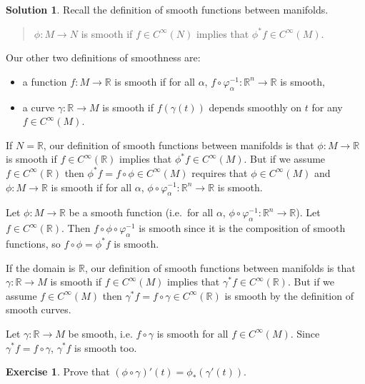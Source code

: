 \documentclass[11pt, a4paper]{article}
\theoremstyle{definition}
\newtheorem{ex}{Exercise}[part]
\newtheorem{sol}{Solution}[part]
\begin{document}
\begin{sol}

Recall the definition of smooth functions between manifolds.

\begin{quote}
    $\phi: M \to N$ is smooth if $f \in C^\infty(N)$ implies that $\phi^* f \in C^\infty(M)$.
\end{quote}

Our other two definitions of smoothness are:
\begin{itemize}
    \item a function $f: M \to \mathbb{R}$ is smooth if for all $\alpha$, $f \circ \varphi_\alpha^{-1}: \mathbb{R}^n \to \mathbb{R}$ is smooth,
    \item a curve $\gamma: \mathbb{R} \to M$ is smooth if $f(\gamma(t))$ depends smoothly on $t$ for any $f \in C^\infty(M)$.
\end{itemize}

If $N = \mathbb{R}$, our definition of smooth functions between manifolds is that $\phi: M \to \mathbb{R}$ is smooth if $f \in C^\infty(\mathbb{R})$ implies that $\phi^* f \in C^\infty(M)$.
But if we assume $f \in C^\infty(\mathbb{R})$ then $\phi^* f = f \circ \phi \in C^\infty(M)$ requires that $\phi \in C^\infty(M)$ and $\phi: M \to \mathbb{R}$ is smooth if for all $\alpha$, $\phi \circ \varphi_\alpha^{-1}: \mathbb{R}^n \to \mathbb{R}$ is smooth.

Let $\phi: M \to \mathbb{R}$ be a smooth function (i.e.\ for all $\alpha$, $\phi \circ \varphi_\alpha^{-1}: \mathbb{R}^n \to \mathbb{R}$).
Let $f \in C^\infty(\mathbb{R})$.
Then $f \circ \phi \circ \varphi_\alpha^{-1}$ is smooth since it is the composition of smooth functions, so $f \circ \phi = \phi^* f$ is smooth.

If the domain is $\mathbb{R}$, our definition of smooth functions between manifolds is that $\gamma: \mathbb{R} \to M$ is smooth if $f \in C^\infty(M)$ implies that $\gamma^* f \in C^\infty(\mathbb{R})$.
But if we assume $f \in C^\infty(M)$ then $\gamma^* f = f \circ \gamma \in C^\infty(\mathbb{R})$ is smooth by the definition of smooth curves.

Let $\gamma: \mathbb{R} \to M$ be smooth, i.e. $f\circ \gamma$ is smooth for all $f \in C^\infty(M)$.
Since $\gamma^* f = f \circ \gamma$, $\gamma^* f$ is smooth too.

\end{sol}

\begin{ex}

Prove that $(\phi \circ \gamma)'(t) = \phi_*(\gamma'(t))$.

\end{ex}
\end{document}
